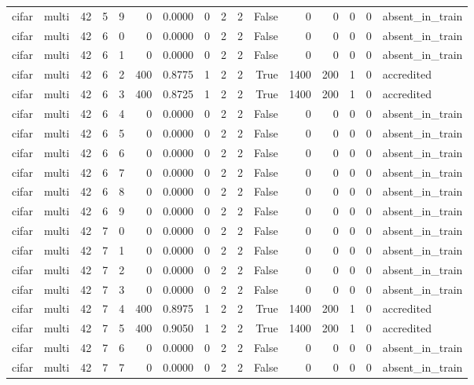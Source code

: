 \begin{tabular}{llrrrrrrrrrrrrrl}
cifar & multi & 42 & 5 & 9 & 0 & 0.0000 & 0 & 2 & 2 & False & 0 & 0 & 0 & 0 & absent\_in\_train \\
cifar & multi & 42 & 6 & 0 & 0 & 0.0000 & 0 & 2 & 2 & False & 0 & 0 & 0 & 0 & absent\_in\_train \\
cifar & multi & 42 & 6 & 1 & 0 & 0.0000 & 0 & 2 & 2 & False & 0 & 0 & 0 & 0 & absent\_in\_train \\
cifar & multi & 42 & 6 & 2 & 400 & 0.8775 & 1 & 2 & 2 & True & 1400 & 200 & 1 & 0 & accredited \\
cifar & multi & 42 & 6 & 3 & 400 & 0.8725 & 1 & 2 & 2 & True & 1400 & 200 & 1 & 0 & accredited \\
cifar & multi & 42 & 6 & 4 & 0 & 0.0000 & 0 & 2 & 2 & False & 0 & 0 & 0 & 0 & absent\_in\_train \\
cifar & multi & 42 & 6 & 5 & 0 & 0.0000 & 0 & 2 & 2 & False & 0 & 0 & 0 & 0 & absent\_in\_train \\
cifar & multi & 42 & 6 & 6 & 0 & 0.0000 & 0 & 2 & 2 & False & 0 & 0 & 0 & 0 & absent\_in\_train \\
cifar & multi & 42 & 6 & 7 & 0 & 0.0000 & 0 & 2 & 2 & False & 0 & 0 & 0 & 0 & absent\_in\_train \\
cifar & multi & 42 & 6 & 8 & 0 & 0.0000 & 0 & 2 & 2 & False & 0 & 0 & 0 & 0 & absent\_in\_train \\
cifar & multi & 42 & 6 & 9 & 0 & 0.0000 & 0 & 2 & 2 & False & 0 & 0 & 0 & 0 & absent\_in\_train \\
cifar & multi & 42 & 7 & 0 & 0 & 0.0000 & 0 & 2 & 2 & False & 0 & 0 & 0 & 0 & absent\_in\_train \\
cifar & multi & 42 & 7 & 1 & 0 & 0.0000 & 0 & 2 & 2 & False & 0 & 0 & 0 & 0 & absent\_in\_train \\
cifar & multi & 42 & 7 & 2 & 0 & 0.0000 & 0 & 2 & 2 & False & 0 & 0 & 0 & 0 & absent\_in\_train \\
cifar & multi & 42 & 7 & 3 & 0 & 0.0000 & 0 & 2 & 2 & False & 0 & 0 & 0 & 0 & absent\_in\_train \\
cifar & multi & 42 & 7 & 4 & 400 & 0.8975 & 1 & 2 & 2 & True & 1400 & 200 & 1 & 0 & accredited \\
cifar & multi & 42 & 7 & 5 & 400 & 0.9050 & 1 & 2 & 2 & True & 1400 & 200 & 1 & 0 & accredited \\
cifar & multi & 42 & 7 & 6 & 0 & 0.0000 & 0 & 2 & 2 & False & 0 & 0 & 0 & 0 & absent\_in\_train \\
cifar & multi & 42 & 7 & 7 & 0 & 0.0000 & 0 & 2 & 2 & False & 0 & 0 & 0 & 0 & absent\_in\_train \\

\end{tabular}

